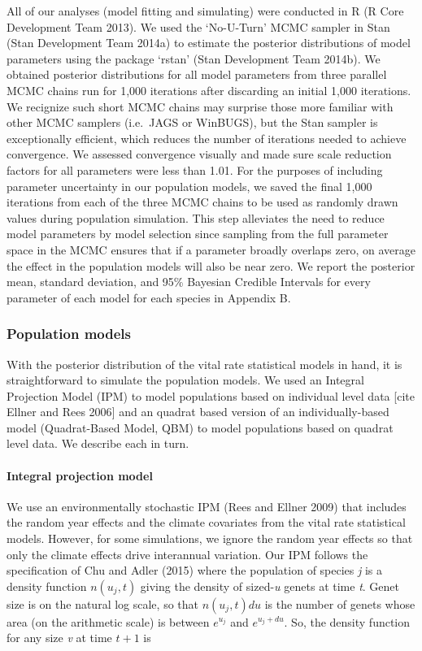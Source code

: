 \documentclass[12pt,]{article}
\begin{document}
All of our analyses (model fitting and simulating) were conducted in R
(R Core Development Team 2013). We used the `No-U-Turn' MCMC sampler in
Stan (Stan Development Team 2014a) to estimate the posterior
distributions of model parameters using the package `rstan' (Stan
Development Team 2014b). We obtained posterior distributions for all
model parameters from three parallel MCMC chains run for 1,000
iterations after discarding an initial 1,000 iterations. We recignize
such short MCMC chains may surprise those more familiar with other MCMC
samplers (i.e.~JAGS or WinBUGS), but the Stan sampler is exceptionally
efficient, which reduces the number of iterations needed to achieve
convergence. We assessed convergence visually and made sure scale
reduction factors for all parameters were less than 1.01. For the
purposes of including parameter uncertainty in our population models, we
saved the final 1,000 iterations from each of the three MCMC chains to
be used as randomly drawn values during population simulation. This step
alleviates the need to reduce model parameters by model selection since
sampling from the full parameter space in the MCMC ensures that if a
parameter broadly overlaps zero, on average the effect in the population
models will also be near zero. We report the posterior mean, standard
deviation, and 95\% Bayesian Credible Intervals for every parameter of
each model for each species in Appendix B.

\subsubsection{Population models}\label{population-models}

With the posterior distribution of the vital rate statistical models in
hand, it is straightforward to simulate the population models. We used
an Integral Projection Model (IPM) to model populations based on
individual level data {[}cite Ellner and Rees 2006{]} and an quadrat
based version of an individually-based model (Quadrat-Based Model, QBM)
to model populations based on quadrat level data. We describe each in
turn.

\paragraph{Integral projection model}\label{integral-projection-model}

We use an environmentally stochastic IPM (Rees and Ellner 2009) that
includes the random year effects and the climate covariates from the
vital rate statistical models. However, for some simulations, we ignore
the random year effects so that only the climate effects drive
interannual variation. Our IPM follows the specification of Chu and
Adler (2015) where the population of species \emph{j} is a density
function $n(u_{j},t)$ giving the density of sized-\emph{u} genets at
time \emph{t}. Genet size is on the natural log scale, so that
$n(u_{j},t)du$ is the number of genets whose area (on the arithmetic
scale) is between $e^{u_{j}}$ and $e^{u_{j}+du}$. So, the density
function for any size \emph{v} at time $t+1$ is
\end{document}
